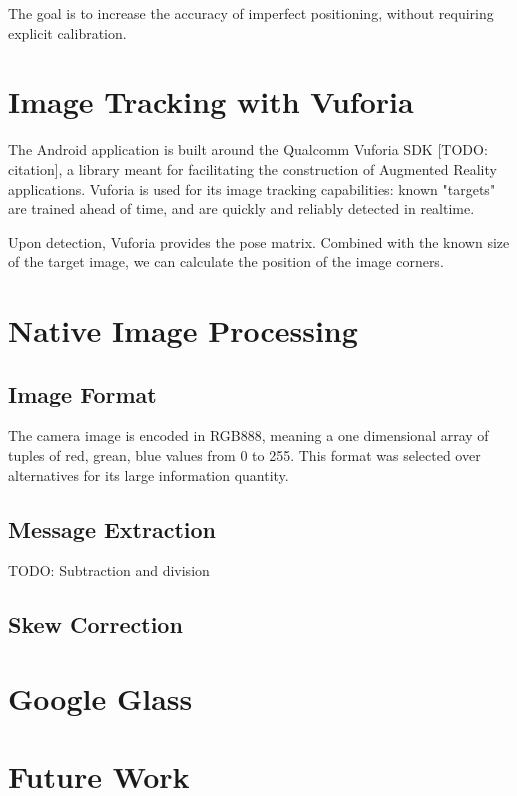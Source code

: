 \documentclass[11pt, letterpaper]{article}
\begin{document}
The goal is to increase the accuracy of imperfect positioning, without requiring explicit calibration.

\section{Image Tracking with Vuforia}
The Android application is built around the Qualcomm Vuforia SDK [TODO: citation], a library meant for facilitating the construction of Augmented Reality applications.
Vuforia is used for its image tracking capabilities: known "targets" are trained ahead of time, and are quickly and reliably detected in realtime.

Upon detection,	Vuforia provides the pose matrix. Combined with the known size of the target image, we can calculate the position of the image corners.
\section{Native Image Processing}
\subsection{Image Format}
The camera image is encoded in RGB888, meaning a one dimensional array of tuples of red, grean, blue values from 0 to 255.
This format was selected over alternatives for its large information quantity.

\subsection{Message Extraction}
TODO: Subtraction and division

\subsection{Skew Correction}

\section{Google Glass}

\section{Future Work}
\end{document}
